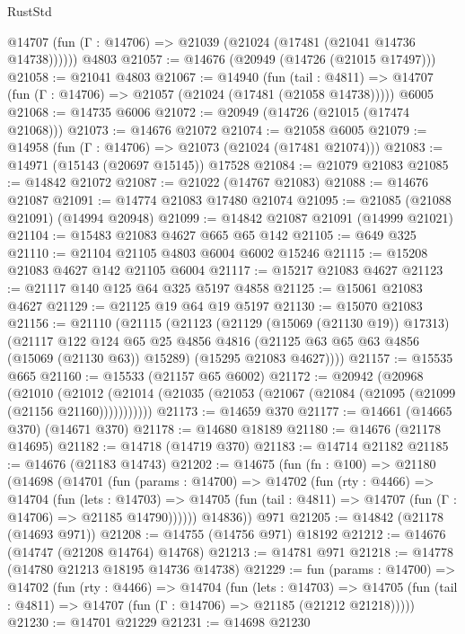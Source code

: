 \begin{lexlean}{RustStd}
\begin{coremodule}
      @14707 (fun (Γ : @14706) => @21039 (@21024 (@17481 (@21041 @14736 @14738))))))
    @4803
@21057 := @14676 (@20949 (@14726 (@21015 @17497)))
@21058 := @21041 @4803
@21067 := @14940
    (fun (tail : @4811) => @14707 (fun (Γ : @14706) => @21057 (@21024 (@17481 (@21058 @14738)))))
    @6005
@21068 := @14735 @6006
@21072 := @20949 (@14726 (@21015 (@17474 @21068)))
@21073 := @14676 @21072
@21074 := @21058 @6005
@21079 := @14958 (fun (Γ : @14706) => @21073 (@21024 (@17481 @21074)))
@21083 := @14971 (@15143 (@20697 @15145)) @17528
@21084 := @21079 @21083
@21085 := @14842 @21072
@21087 := @21022 (@14767 @21083)
@21088 := @14676 @21087
@21091 := @14774 @21083 @17480 @21074
@21095 := @21085 (@21088 @21091) (@14994 @20948)
@21099 := @14842 @21087 @21091 (@14999 @21021)
@21104 := @15483 @21083 @4627 @665 @65 @142
@21105 := @649 @325
@21110 := @21104 @21105 @4803 @6004 @6002 @15246
@21115 := @15208 @21083 @4627 @142 @21105 @6004
@21117 := @15217 @21083 @4627
@21123 := @21117 @140 @125 @64 @325 @5197 @4858
@21125 := @15061 @21083 @4627
@21129 := @21125 @19 @64 @19 @5197
@21130 := @15070 @21083
@21156 := @21110
    (@21115
      (@21123
        (@21129 (@15069 (@21130 @19)) @17313)
        (@21117
          @122
          @124
          @65
          @25
          @4856
          @4816
          (@21125 @63 @65 @63 @4856 (@15069 (@21130 @63)) @15289)
          (@15295 @21083 @4627))))
@21157 := @15535 @665
@21160 := @15533 (@21157 @65 @6002)
@21172 := @20942
    (@20968
      (@21010
        (@21012 (@21014 (@21035 (@21053 (@21067 (@21084 (@21095 (@21099 (@21156 @21160)))))))))))
@21173 := @14659 @370
@21177 := @14661 (@14665 @370) (@14671 @370)
@21178 := @14680 @18189
@21180 := @14676 (@21178 @14695)
@21182 := @14718 (@14719 @370)
@21183 := @14714 @21182
@21185 := @14676 (@21183 @14743)
@21202 := @14675
    (fun (fn : @100) =>
    @21180
      (@14698
        (@14701
          (fun (params : @14700) =>
          @14702
            (fun (rty : @4466) =>
            @14704
              (fun (lets : @14703) =>
              @14705 (fun (tail : @4811) => @14707 (fun (Γ : @14706) => @21185 @14790))))))
        @14836))
    @971
@21205 := @14842 (@21178 (@14693 @971))
@21208 := @14755 (@14756 @971) @18192
@21212 := @14676 (@14747 (@21208 @14764) @14768)
@21213 := @14781 @971
@21218 := @14778 (@14780 @21213 @18195 @14736 @14738)
@21229 := fun (params : @14700) =>
  @14702
    (fun (rty : @4466) =>
    @14704
      (fun (lets : @14703) =>
      @14705 (fun (tail : @4811) => @14707 (fun (Γ : @14706) => @21185 (@21212 @21218)))))
@21230 := @14701 @21229
@21231 := @14698 @21230

\end{coremodule}
\end{lexlean}
